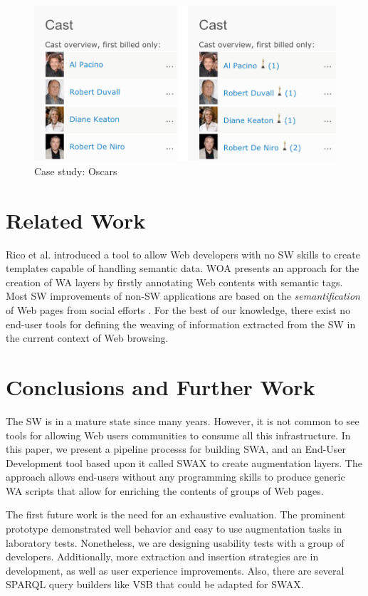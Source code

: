 \documentclass[runningheads,anonymous]{llncs}
\begin{document}
\begin{figure}
  \centering
    \includegraphics[width=0.7\linewidth]{oscars.png}
    \caption{Case study: Oscars}
    \label{fig-oscars}
\end{figure}

\section{Related Work}
\label{sec-related_work}
Rico et al. \cite{Rico2012AData} introduced a tool to allow Web developers with no SW skills to create templates capable of handling semantic data. 
WOA \cite{DBLP:conf/icwe/FirmenichBRWB16} presents an approach for the creation of WA layers by firstly annotating Web contents with semantic tags. 
Most SW improvements of non-SW applications are based on the \textit{semantification} of Web pages from social efforts \cite{torres2011semdrops,annoteawww10}. 
For the best of our knowledge, there exist no end-user tools for defining the weaving of information extracted from the SW in the current context of Web browsing.
 
\section{Conclusions and Further Work}
\label{sec-conclusions}


The SW is in a mature state since many years. However, it is not common to see tools for allowing Web users communities to consume all this infrastructure. In this paper, we present a pipeline processs for building SWA, and an End-User Development tool based upon it called SWAX to create augmentation layers. The approach allows end-users without any programming skills to produce generic WA scripts that allow for enriching the contents of groups of Web pages.

The first future work is the need for an exhaustive evaluation. The prominent prototype demonstrated well behavior and easy to use augmentation tasks in laboratory tests. Nonetheless, we are designing usability tests with a group of developers. Additionally, more extraction and insertion strategies are in development, as well as user experience improvements. Also, there are several SPARQL query builders like VSB that could be adapted for SWAX.




\end{document}
